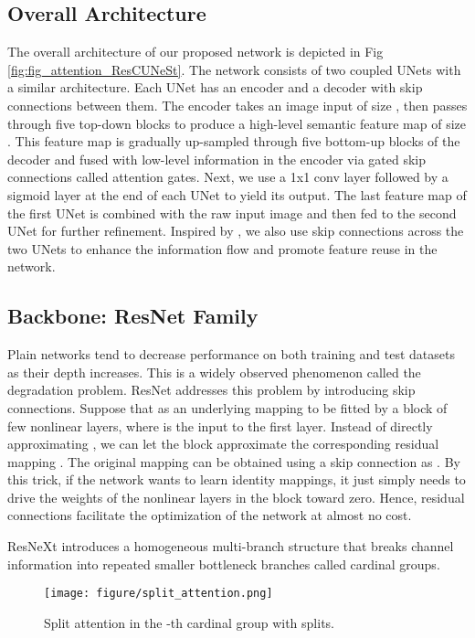 \documentclass[review, sort&compress]{elsarticle}
\begin{document}
	\subsection{Overall Architecture}
	The overall architecture of our proposed network is depicted in Fig \ref{fig:fig_attention_ResCUNeSt}. The network consists of two coupled UNets with a similar architecture. Each UNet has an encoder and a decoder with skip connections between them. The encoder takes an image input of size , then passes through five top-down blocks to produce a high-level semantic feature map of size . This feature map is gradually up-sampled through five bottom-up blocks of the decoder and fused with low-level information in the encoder via gated skip connections called attention gates. Next, we use a 1x1 conv layer followed by a sigmoid layer at the end of each UNet to yield its output. The last feature map of the first UNet is combined with the raw input image and then fed to the second UNet for further refinement. Inspired by \cite{tang2019cu}, we also use skip connections across the two UNets to enhance the information flow and promote feature reuse in the network.
	
	\subsection{Backbone: ResNet Family}
	Plain networks tend to decrease performance on both training and test datasets as their depth increases. This is a widely observed phenomenon called the degradation problem. ResNet \cite{he2016deep} addresses this problem by introducing skip connections.
	Suppose that  as an underlying mapping to be fitted by a block of few nonlinear layers, where  is the input to the first layer. Instead of directly approximating , we can let the block approximate the corresponding residual mapping . The original mapping can be obtained using a skip connection as . By this trick, if the network wants to learn identity mappings, it just simply needs to drive the weights of the nonlinear layers in the block toward zero. Hence, residual connections facilitate the optimization of the network at almost no cost.
	
	ResNeXt \cite{xie2017aggregated} introduces a homogeneous multi-branch structure that breaks channel information into  repeated smaller bottleneck branches called cardinal groups.
	
	\begin{figure*}[ht!]
		\centering
		\texttt{[image: figure/split\_attention.png]}
		\caption{Split attention in the -th cardinal group with  splits.}
		\label{fig:spit_attention}
	\end{figure*}
	
\end{document}
